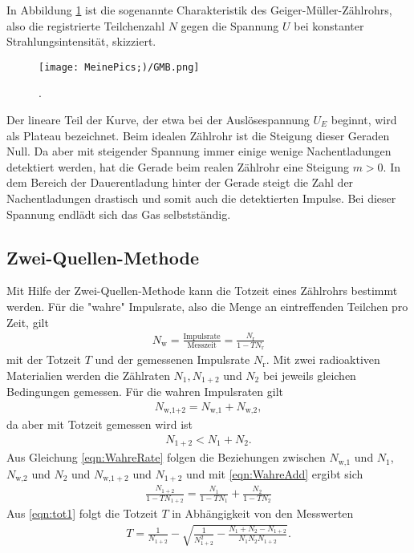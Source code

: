 In Abbildung \ref{fig:GMB} ist die sogenannte Charakteristik des
Geiger-Müller-Zählrohrs, also die registrierte Teilchenzahl $N$ gegen die
Spannung $U$ bei konstanter Strahlungsintensität, skizziert.

\begin{figure}
  \centering
  \texttt{[image: MeinePics;)/GMB.png]}
  \caption{.\cite{anleitung}}
  \label{fig:GMB}
\end{figure}

\FloatBarrier

Der lineare Teil der Kurve, der etwa bei der Auslösespannung $U_E$ beginnt,
wird als Plateau bezeichnet.
Beim idealen Zählrohr ist die Steigung dieser Geraden Null. Da aber mit
steigender Spannung immer einige wenige Nachentladungen detektiert werden,
hat die Gerade beim realen Zählrohr eine Steigung $m > 0$.
In dem Bereich der Dauerentladung hinter der Gerade steigt die Zahl der
Nachentladungen drastisch und somit auch die detektierten Impulse.
Bei dieser Spannung endlädt sich das Gas selbstständig.

\subsection{Zwei-Quellen-Methode}

Mit Hilfe der Zwei-Quellen-Methode kann die Totzeit eines Zählrohrs bestimmt
werden.
Für die "wahre" Impulsrate, also die Menge an eintreffenden Teilchen pro
Zeit, gilt
\begin{align}
  N_\text{w} = \frac{\text{Impulsrate}}{\text{Messzeit}} =
  \frac{N_\text{r}}{1-TN_\text{r}}
  \label{eqn:WahreRate}
\end{align}
mit der Totzeit $T$ und der gemessenen Impulsrate $N_\text{r}$.
Mit zwei radioaktiven Materialien werden die Zählraten
$N_1, N_{1+2}$ und $N_2$ bei jeweils gleichen Bedingungen gemessen.
Für die wahren Impulsraten gilt
\begin{align}
  N_\text{{w,}1+2} = N_\text{w,1} + N_\text{w,2},
  \label{eqn:WahreAdd}
\end{align}
da aber mit Totzeit gemessen wird ist
\begin{align}
  N_{1+2} < N_1 + N_2.
\end{align}
Aus Gleichung \eqref{eqn:WahreRate} folgen die Beziehungen zwischen
$N_\text{w,1}$ und $N_1$, $N_\text{w,2}$ und $N_2$ und
$N_{\text{w,}1+2}$ und $N_{1+2}$
und mit \eqref{eqn:WahreAdd} ergibt sich
\begin{align}
  \frac{N_{1+2}}{1-TN_{1+2}} = \frac{N_1}{1-TN_1} + \frac{N_2}{1-TN_2}
  \label{eqn:tot1}
\end{align}
Aus \eqref{eqn:tot1} folgt die Totzeit $T$ in Abhängigkeit von den Messwerten
\begin{align}
  T = \frac{1}{N_{1+2}} - \sqrt{\frac{1}{N_{1+2}^2}-\frac{N_1 + N_2 - N_{1+2}}{N_1 N_2 N_{1+2}}}.
  \label{eqn:totzeit2quellen}
\end{align}


